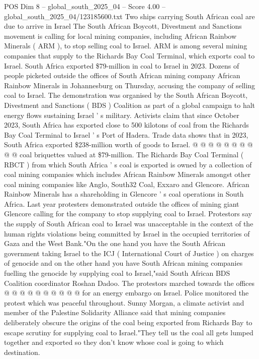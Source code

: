 \begin{textsample}{POS Dim 8 – global\_south\_2025\_04 – Score 4.00 – global\_south\_2025\_04/123185600.txt}  \label{ex:f8_pos_164}
Two ships carrying South African coal are due to arrive in Israel The South African Boycott, Divestment and Sanctions movement is calling for local mining companies, including African Rainbow Minerals ( ARM ), to stop selling coal to Israel.
ARM is among several mining companies that supply to the Richards Bay Coal Terminal, which exports coal to Israel.
South Africa exported \$79-million in coal to Israel in 2023.
Dozens of people picketed outside the offices of South African mining company African Rainbow Minerals in Johannesburg on Thursday, accusing the company of selling coal to Israel.
The demonstration was organised by the South African Boycott, Divestment and Sanctions ( BDS ) Coalition as part of a global campaign to halt energy flows sustaining Israel ' s military.
Activists claim that since October 2023, South Africa has exported close to 500 kilotons of coal from the Richards Bay Coal Terminal to Israel ' s Port of Hadera.
Trade data shows that in 2023, South Africa exported \$238-million worth of goods to Israel. @ @ @ @ @ @ @ @ @ @ coal briquettes valued at \$79-million.
The Richards Bay Coal Terminal ( RBCT ) from which South Africa ' s coal is exported is owned by a collection of coal mining companies which includes African Rainbow Minerals amongst other coal mining companies like Anglo, South32 Coal, Exxaro and Glencore.
African Rainbow Minerals has a shareholding in Glencore ' s coal operations in South Africa.
Last year protesters demonstrated outside the offices of mining giant Glencore calling for the company to stop supplying coal to Israel.
Protestors say the supply of South African coal to Israel was unacceptable in the context of the human rights violations being committed by Israel in the occupied territories of Gaza and the West Bank."On the one hand you have the South African government taking Israel to the ICJ ( International Court of Justice ) on charges of genocide and on the other hand you have South African mining companies fuelling the genocide by supplying coal to Israel,"said South African BDS Coalition coordinator Roshan Dadoo.
The protestors marched towards the offices @ @ @ @ @ @ @ @ @ @ for an energy embargo on Israel.
Police monitored the protest which was peaceful throughout.
Sunny Morgan, a climate activist and member of the Palestine Solidarity Alliance said that mining companies deliberately obscure the origins of the coal being exported from Richards Bay to escape scrutiny for supplying coal to Israel."They tell us the coal all gets lumped together and exported so they don't know whose coal is going to which destination.

\end{textsample}
